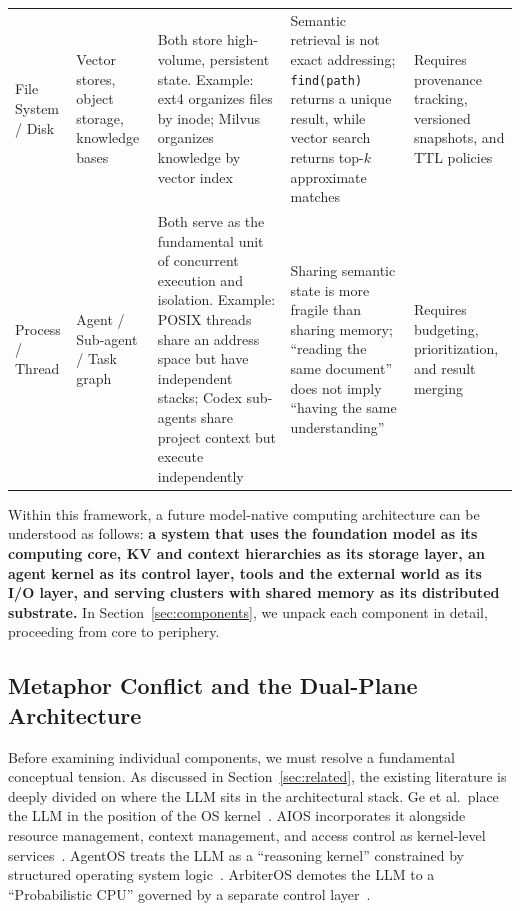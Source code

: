 \begin{longtable}{p{}p{}p{}p{}p{}}
File System / Disk & Vector stores, object storage, knowledge bases & Both store high-volume, persistent state. Example: ext4 organizes files by inode; Milvus organizes knowledge by vector index~\cite{lewis2020rag} & Semantic retrieval is not exact addressing; \texttt{find(path)} returns a unique result, while vector search returns top-$k$ approximate matches & Requires provenance tracking, versioned snapshots, and TTL policies \\[3pt]

Process / Thread & Agent / Sub-agent / Task graph & Both serve as the fundamental unit of concurrent execution and isolation. Example: POSIX threads share an address space but have independent stacks; Codex sub-agents share project context but execute independently~\cite{openai_codex_overview_2026} & Sharing semantic state is more fragile than sharing memory; ``reading the same document'' does not imply ``having the same understanding'' & Requires budgeting, prioritization, and result merging \\

\bottomrule
\end{longtable}
\renewcommand{\arraystretch}{1.0}
\normalsize

Within this framework, a future model-native computing architecture can be understood as follows: \textbf{a system that uses the foundation model as its computing core, KV and context hierarchies as its storage layer, an agent kernel as its control layer, tools and the external world as its I/O layer, and serving clusters with shared memory as its distributed substrate.}
In Section~\ref{sec:components}, we unpack each component in detail, proceeding from core to periphery.

\subsection{Metaphor Conflict and the Dual-Plane Architecture}

Before examining individual components, we must resolve a fundamental conceptual tension.
As discussed in Section~\ref{sec:related}, the existing literature is deeply divided on where the LLM sits in the architectural stack.
Ge et al.\ place the LLM in the position of the OS kernel~\cite{ge2023llmos}.
AIOS incorporates it alongside resource management, context management, and access control as kernel-level services~\cite{mei2024aios}.
AgentOS treats the LLM as a ``reasoning kernel'' constrained by structured operating system logic~\cite{agentos2025}.
ArbiterOS demotes the LLM to a ``Probabilistic CPU'' governed by a separate control layer~\cite{arbiteros2025}.

